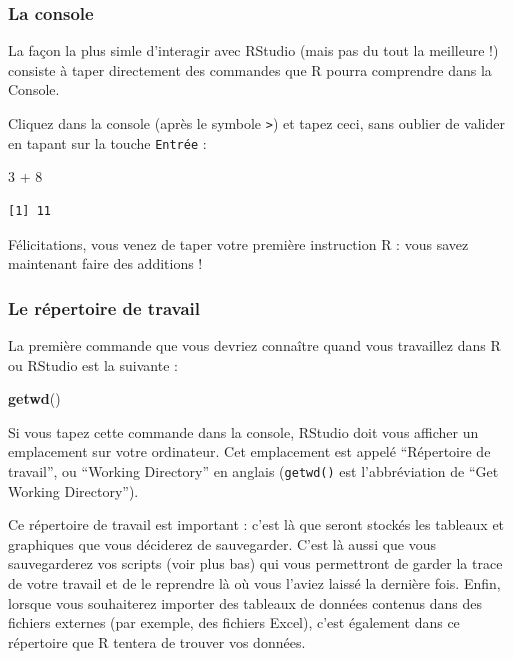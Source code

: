 \documentclass[a4paperpaper,]{article}
\newenvironment{Shaded}{\begin{snugshade}}{\end{snugshade}}
\newcommand{\DecValTok}[1]{\textcolor[rgb]{0.69,0.50,0.00}{#1}}
\newcommand{\KeywordTok}[1]{\textcolor[rgb]{0.12,0.11,0.11}{\textbf{#1}}}
\newcommand{\NormalTok}[1]{\textcolor[rgb]{0.12,0.11,0.11}{#1}}
\newcommand{\OperatorTok}[1]{\textcolor[rgb]{0.12,0.11,0.11}{#1}}
\newcommand{\StringTok}[1]{\textcolor[rgb]{0.75,0.01,0.01}{#1}}
\theoremstyle{definition}
\theoremstyle{definition}
\theoremstyle{definition}
\theoremstyle{remark}
\begin{document}
\hypertarget{la-console}{%
\subsubsection{La console}\label{la-console}}

La façon la plus simle d'interagir avec RStudio (mais pas du tout la
meilleure !) consiste à taper directement des commandes que R pourra
comprendre dans la Console.

Cliquez dans la console (après le symbole \texttt{\textgreater{}}) et
tapez ceci, sans oublier de valider en tapant sur la touche
\texttt{Entrée} :

\begin{Shaded}
\begin{Highlighting}[]
\DecValTok{3} \OperatorTok{+}\StringTok{ }\DecValTok{8}
\end{Highlighting}
\end{Shaded}

\begin{verbatim}
[1] 11
\end{verbatim}

Félicitations, vous venez de taper votre première instruction R : vous
savez maintenant faire des additions !

\hypertarget{le-repertoire-de-travail}{%
\subsubsection{Le répertoire de
travail}\label{le-repertoire-de-travail}}

La première commande que vous devriez connaître quand vous travaillez
dans R ou RStudio est la suivante :

\begin{Shaded}
\begin{Highlighting}[]
\KeywordTok{getwd}\NormalTok{()}
\end{Highlighting}
\end{Shaded}

Si vous tapez cette commande dans la console, RStudio doit vous afficher
un emplacement sur votre ordinateur. Cet emplacement est appelé
``Répertoire de travail'', ou ``Working Directory'' en anglais
(\texttt{getwd()} est l'abbréviation de ``Get Working Directory'').

Ce répertoire de travail est important : c'est là que seront stockés les
tableaux et graphiques que vous déciderez de sauvegarder. C'est là aussi
que vous sauvegarderez vos scripts (voir plus bas) qui vous permettront
de garder la trace de votre travail et de le reprendre là où vous
l'aviez laissé la dernière fois. Enfin, lorsque vous souhaiterez
importer des tableaux de données contenus dans des fichiers externes
(par exemple, des fichiers Excel), c'est également dans ce répertoire
que R tentera de trouver vos données.
\end{document}
